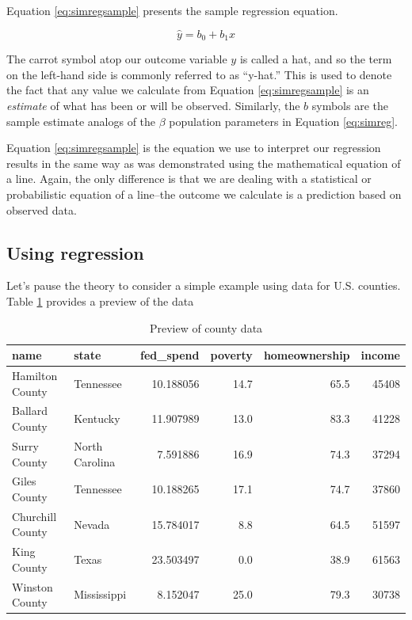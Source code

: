 \documentclass[
]{book}
\begin{document}
Equation \eqref{eq:simregsample} presents the sample regression equation.

\begin{equation}
\hat{y}=b_0+b_1x
\label{eq:simregsample}
\end{equation}

The carrot symbol atop our outcome variable \(y\) is called a hat, and so the term on the left-hand side is commonly referred to as ``y-hat.'' This is used to denote the fact that any value we calculate from Equation \eqref{eq:simregsample} is an \emph{estimate} of what has been or will be observed. Similarly, the \(b\) symbols are the sample estimate analogs of the \(\beta\) population parameters in Equation \eqref{eq:simreg}.

Equation \eqref{eq:simregsample} is the equation we use to interpret our regression results in the same way as was demonstrated using the mathematical equation of a line. Again, the only difference is that we are dealing with a statistical or probabilistic equation of a line--the outcome we calculate is a prediction based on observed data.

\hypertarget{using-regression}{%
\subsection{Using regression}\label{using-regression}}

Let's pause the theory to consider a simple example using data for U.S. counties. Table \ref{tab:countydata} provides a preview of the data

\begin{table}

\caption{\label{tab:countydata}Preview of county data}
\centering
\begin{tabular}[t]{l|l|r|r|r|r}
\hline
name & state & fed\_spend & poverty & homeownership & income\\
\hline
Hamilton County & Tennessee & 10.188056 & 14.7 & 65.5 & 45408\\
\hline
Ballard County & Kentucky & 11.907989 & 13.0 & 83.3 & 41228\\
\hline
Surry County & North Carolina & 7.591886 & 16.9 & 74.3 & 37294\\
\hline
Giles County & Tennessee & 10.188265 & 17.1 & 74.7 & 37860\\
\hline
Churchill County & Nevada & 15.784017 & 8.8 & 64.5 & 51597\\
\hline
King County & Texas & 23.503497 & 0.0 & 38.9 & 61563\\
\hline
Winston County & Mississippi & 8.152047 & 25.0 & 79.3 & 30738\\
\hline
\end{tabular}
\end{table}
\end{document}

